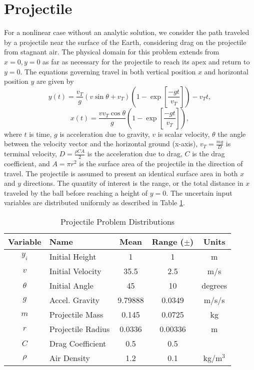 \section{Projectile}
For a nonlinear case without an analytic solution, we consider the path traveled by a projectile near the
surface of the Earth, considering drag on the projectile from stagnant air.  
The physical domain for this problem extends from $x=0,y=0$ as far as necessary for the projectile to reach
its apex and return to $y=0$.
The equations governing travel in both vertical position $x$ and horizontal position $y$
are given by
\begin{equation}
  y(t) = \frac{v_T}{g}(v\sin\theta+v_T)\left(1-\exp\left[\frac{-gt}{v_T}\right]\right)-v_T t,
\end{equation}
\begin{equation}
  x(t) = \frac{vv_T\cos\theta}{g}\left(1-\exp\left[\frac{-gt}{v_T}\right]\right),
\end{equation}
where $t$ is time, $g$ is acceleration due to gravity, $v$ is scalar velocity, $\theta$ the angle between the
velocity vector and the horizontal ground (x-axis), $v_T=\frac{mg}{D}$ is terminal velocity, $D=\frac{\rho CA}{2}$ is
the acceleration due to drag, $C$ is the drag coefficient, and $A=\pi r^2$
is the surface area of the projectile in the direction of travel.  The projectile is assumed to present an
identical surface area in both $x$ and $y$ directions.  The quantity of interest is the range, or the total
distance in $x$ traveled by the ball before reaching a height of $y=0$.  The uncertain input variables are
distributed uniformly as described in Table \ref{tab:proj dist}.

\begin{table}[h]
\centering
\begin{tabular}{c | l | c c | c}
  Variable & Name & Mean & Range ($\pm$) & Units \\\hline
  $y_i$ & Initial Height & 1 & 1 & m\\
  $v$ & Initial Velocity & 35.5 & 2.5 & m/s\\
  $\theta$ & Initial Angle & 45 & 10 & degrees\\
  $g$ & Accel. Gravity & 9.79888 & 0.0349 & m/s/s\\
  $m$ & Projectile Mass & 0.145 & 0.0725 & kg\\
  $r$ & Projectile Radius & 0.0336 & 0.00336 & m\\
  $C$ & Drag Coefficient & 0.5 & 0.5 & \\
  $\rho$ & Air Density & 1.2 & 0.1 & kg/m$^3$ \\
\end{tabular}
\caption{Projectile Problem Distributions}
\label{tab:proj dist}
\end{table}

